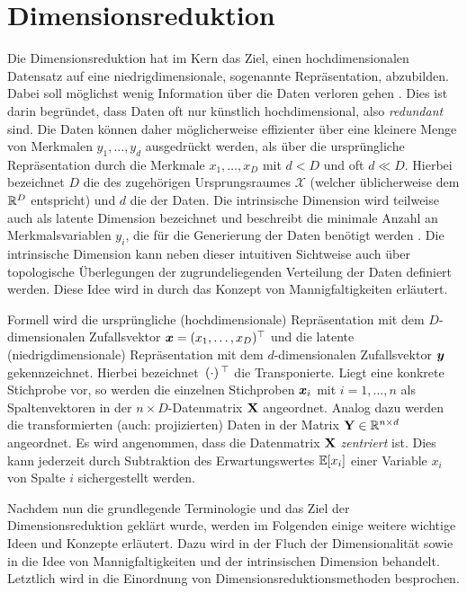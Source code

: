 \chapter{Dimensionsreduktion}
\label{ch:Dimensionsreduktion}

Die Dimensionsreduktion hat im Kern das Ziel, einen hochdimensionalen Datensatz auf eine
niedrigdimensionale, sogenannte  Repräsentation, abzubilden. Dabei soll möglichst
wenig Information über die Daten verloren gehen \parencite[2]{Lee.2007}. Dies ist darin begründet, dass Daten oft nur künstlich hochdimensional, also
\textit{redundant} sind. Die Daten können daher möglicherweise effizienter über eine kleinere Menge
von Merkmalen $y_1,\ldots,y_d$ ausgedrückt werden, als über die ursprüngliche Repräsentation durch
die Merkmale $x_1,\ldots,x_D$ mit $d < D$ und oft $d \ll D$. Hierbei bezeichnet $D$ die
 des zugehörigen Ursprungsraumes $\mathcal{X}$ (welcher
üblicherweise dem $\mathbb{R}^D$ entspricht) und $d$ die  der Daten. Die
intrinsische Dimension wird teilweise auch als latente Dimension bezeichnet und beschreibt die
minimale Anzahl an Merkmalsvariablen $y_i$, die für die Generierung der Daten benötigt werden \parencite[47]{Lee.2007}. Die intrinsische Dimension kann neben dieser intuitiven Sichtweise auch über
topologische Überlegungen der zugrundeliegenden Verteilung der Daten definiert werden. Diese Idee
wird in  durch das Konzept von
Mannigfaltigkeiten erläutert.

Formell wird die ursprüngliche (hochdimensionale) Repräsentation mit dem $D$-dimensionalen
Zufallsvektor $\bm{x} = (x_1, \ldots, x_D)^\top$ und die latente (niedrigdimensionale)
Repräsentation mit dem $d$-dimensionalen Zufallsvektor $\bm{y}$ gekennzeichnet. Hierbei
bezeichnet $\,(\cdot)\,^\top$ die Transponierte. Liegt eine konkrete Stichprobe vor, so werden die
einzelnen Stichproben $\bm{x}_i$ mit $i = 1, \ldots,n$ als Spaltenvektoren in der $n \times
	D$-Datenmatrix $\mathbf{X}$ angeordnet. Analog dazu werden die transformierten (auch: projizierten)
Daten in der Matrix $\mathbf{Y} \in \mathbb{R}^{n \times d}$ angeordnet. Es wird angenommen, dass die
Datenmatrix $\mathbf{X}$ \textit{zentriert} ist. Dies kann jederzeit durch Subtraktion des
Erwartungswertes $\operatorname{\mathbb{E}}[x_i]$ einer Variable $x_i$ von Spalte $i$ sichergestellt werden.

Nachdem nun die grundlegende Terminologie und das Ziel der Dimensionsreduktion geklärt wurde,
werden im Folgenden einige weitere wichtige Ideen und Konzepte erläutert. Dazu wird in
 der Fluch der Dimensionalität sowie in
 die Idee von Mannigfaltigkeiten und
der intrinsischen Dimension behandelt. Letztlich wird in 
die Einordnung von Dimensionsreduktionsmethoden besprochen.

